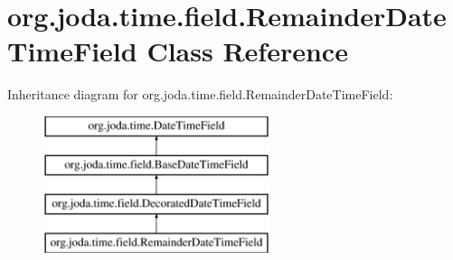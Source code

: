 \hypertarget{classorg_1_1joda_1_1time_1_1field_1_1_remainder_date_time_field}{\section{org.\-joda.\-time.\-field.\-Remainder\-Date\-Time\-Field Class Reference}
\label{classorg_1_1joda_1_1time_1_1field_1_1_remainder_date_time_field}
}
Inheritance diagram for org.\-joda.\-time.\-field.\-Remainder\-Date\-Time\-Field\-:\begin{figure}[H]
\begin{center}
\leavevmode
\includegraphics[height=4.000000cm]{classorg_1_1joda_1_1time_1_1field_1_1_remainder_date_time_field}
\end{center}
\end{figure}

